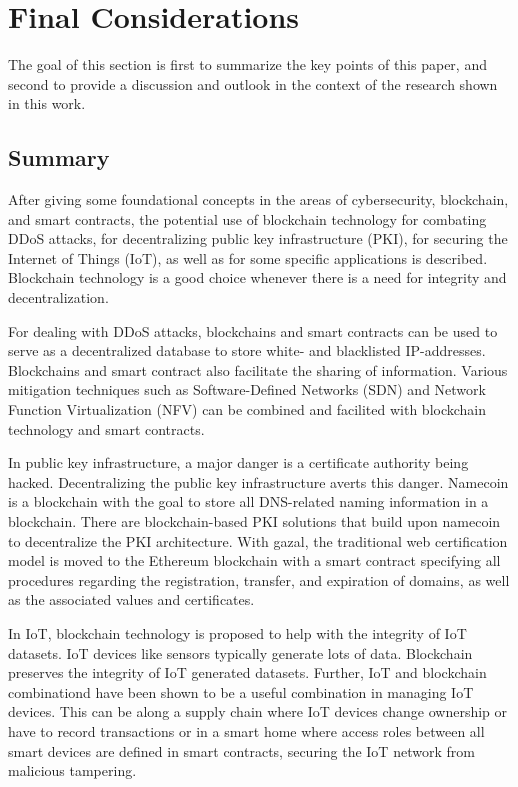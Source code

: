 \section{Final Considerations}

The goal of this section is first to summarize the key points of this paper, and second to provide a discussion and outlook in the context of the research shown in this work.

\subsection{Summary}

After giving some foundational concepts in the areas of cybersecurity, blockchain, and smart contracts, the potential use of blockchain technology for combating DDoS attacks, for decentralizing public key infrastructure (PKI), for securing the Internet of Things (IoT), as well as for some specific applications is described. Blockchain technology is a good choice whenever there is a need for integrity and decentralization.

For dealing with DDoS attacks, blockchains and smart contracts can be used to serve as a decentralized database to store white- and blacklisted IP-addresses. Blockchains and smart contract also facilitate the sharing of information.
Various mitigation techniques such as Software-Defined Networks (SDN) and Network Function Virtualization (NFV) can be combined and facilited with blockchain technology and smart contracts.

In public key infrastructure, a major danger is a certificate authority being hacked. Decentralizing the public key infrastructure averts this danger. Namecoin is a blockchain with the goal to store all DNS-related naming information in a blockchain. There are blockchain-based PKI solutions that build upon namecoin to decentralize the PKI architecture.
With gazal, the traditional web certification model is moved to the Ethereum blockchain with a smart contract specifying all procedures regarding the registration, transfer, and expiration of domains, as well as the associated values and certificates.

In IoT, blockchain technology is proposed to help with the integrity of IoT datasets. IoT devices like sensors typically generate lots of data. Blockchain preserves the integrity of IoT generated datasets. Further, IoT and blockchain combinationd have been shown to be a useful
combination in managing IoT devices. This can be along a supply chain where IoT devices change ownership or have to record transactions or in a smart home
where access roles between all smart devices are defined in smart contracts, securing the IoT network from malicious tampering.

